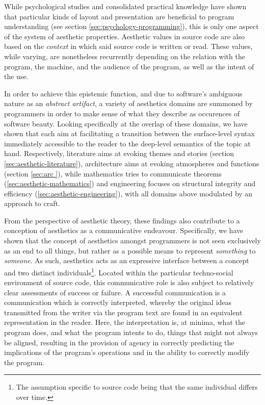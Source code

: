 While psychological studies and consolidated practical knowledge have shown that particular kinds of layout and presentation are beneficial to program understanding (see section \ref{sec:psychology-programming}), this is only one aspect of the system of aesthetic properties. Aesthetic values in source code are also based on the \emph{context} in which said source code is written or read. These values, while varying, are nonetheless recurrently depending on the relation with the program, the machine, and the audience of the program, as well as the intent of the use.

In order to achieve this epistemic function, and due to software's ambiguous nature as an \emph{abstract artifact}, a variety of aesthetics domains are summoned by programmers in order to make sense of what they describe as occurences of software beauty. Looking specifically at the overlap of these domains, we have shown that each aim at facilitating a transition between the surface-level syntax immediately accessible to the reader to the deep-level semantics of the topic at hand. Respectively, literature aims at evoking themes and stories (section \ref{sec:aesthetic-literature}), architecture aims at evoking atmospheres and functions (section \ref{sec:arc
}), while mathematics tries to communicate theorems (\ref{sec:aesthetic-mathematics}) and engineering focuses on structural integrity and efficiency (\ref{sec:aesthetic-engineering}), with all domains above modulated by an approach to craft.

From the perspective of aesthetic theory, these findings also contribute to a conception of aesthetics as a communicative endeavour. Specifically, we have shown that the concept of aesthetics amongst programmers is not seen exclusively as an end to all things, but rather as a possible means to represent \emph{something} to \emph{someone}. As such, aesthetics acts as an expressive interface between a concept and two distinct individuals\footnote{The assumption specific to source code being that the same individual differs over time.}. Located within the particular techno-social environment of source code, this communicative role is also subject to relatively clear assessments of success or failure. A successful communication is a communication which is correctly interpreted, whereby the original ideas transmitted from the writer via the program text are found in an equivalent representation in the reader. Here, the interpretation is, at minima, what the program does, and what the program intents to do, things that might not always be aligned, resulting in the provision of agency in correctly predicting the implications of the program's operations and in the ability to correctly modify the program.

